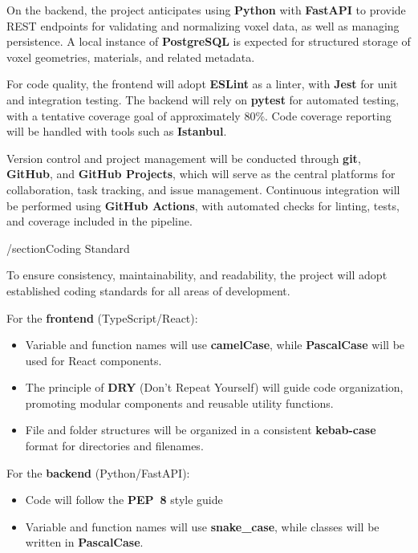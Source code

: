 \documentclass{article}
\begin{document}
On the backend, the project anticipates using \textbf{Python} with
\textbf{FastAPI} to provide REST endpoints for validating and normalizing voxel
data, as well as managing persistence. A local instance of
\textbf{PostgreSQL} is expected for structured storage of voxel geometries,
materials, and related metadata.

For code quality, the frontend will adopt \textbf{ESLint} as a linter, with
\textbf{Jest} for unit and integration testing. The backend will rely on
\textbf{pytest} for automated testing, with a tentative coverage goal of
approximately 80\%. Code coverage reporting will be handled with tools such as
\textbf{Istanbul}.

Version control and project management will be conducted through
\textbf{git}, \textbf{GitHub}, and \textbf{GitHub Projects}, which will serve
as the central platforms for collaboration, task tracking, and issue
management. Continuous integration will be performed using
\textbf{GitHub Actions}, with automated checks for linting, tests, and coverage
included in the pipeline.

/section{Coding Standard}

\iffalse
\wss{What coding standard will you adopt?}
\fi

To ensure consistency, maintainability, and readability, the project will adopt
established coding standards for all areas of development.

For the \textbf{frontend} (TypeScript/React):
\begin{itemize}

\item Variable and function names will use \textbf{camelCase}, while
  \textbf{PascalCase} will be used for React components.
  \item The principle of \textbf{DRY} (Don’t Repeat Yourself) will guide code
  organization, promoting modular components and reusable utility functions.
  \item File and folder structures will be organized in a consistent
  \textbf{kebab-case} format for directories and filenames.
\end{itemize}

For the \textbf{backend} (Python/FastAPI):
\begin{itemize}
  \item Code will follow the \textbf{PEP~8} style guide
  \item Variable and function names will use \textbf{snake\_case}, while classes
  will be written in \textbf{PascalCase}.
\end{itemize}
\end{document}
